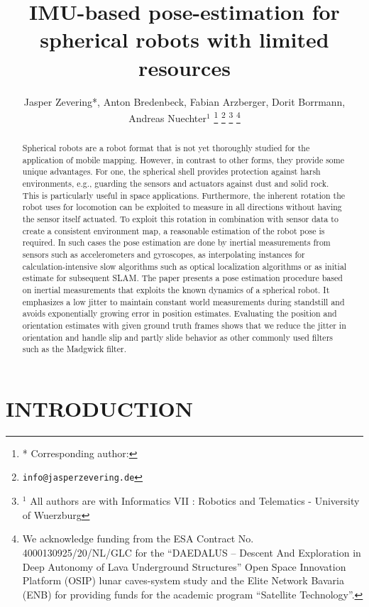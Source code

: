 \documentclass[letterpaper, 10 pt, conference]{ieeeconf}  %
\title{\LARGE \bf
IMU-based pose-estimation for spherical robots with limited resources
}
\author{Jasper Zevering*, Anton Bredenbeck, Fabian Arzberger, Dorit Borrmann, Andreas Nuechter$^{1}$%
\thanks{*
        Corresponding author: }%
        \thanks{ \quad  \tt\small info@jasperzevering.de}%
\thanks{$^{1}$ All authors are with Informatics VII : Robotics and Telematics - University of Wuerzburg}%
\thanks{We acknowledge funding from the ESA Contract No. 4000130925/20/NL/GLC for the ``DAEDALUS -- Descent And Exploration in Deep Autonomy of Lava Underground Structures” Open Space Innovation Platform (OSIP) lunar caves-system study and the Elite Network Bavaria (ENB) for providing funds for the academic program “Satellite Technology''.}
}
\begin{document}
\maketitle
\thispagestyle{empty}
\pagestyle{empty}


\begin{abstract}

Spherical robots are a robot format that is not yet thoroughly studied for the application of mobile mapping.
However, in contrast to other forms, they provide some unique advantages.
For one, the spherical shell provides protection against harsh environments, e.g., guarding the sensors and actuators against dust and solid rock.
This is particularly useful in space applications. 
Furthermore, the inherent rotation the robot uses for locomotion can be exploited to measure in all directions without having the sensor itself actuated.
To exploit this rotation in combination with sensor data to create a consistent environment map, a reasonable estimation of the robot pose is required. 
In such cases the pose estimation are done by inertial measurements from sensors such as accelerometers and gyroscopes, as interpolating instances for calculation-intensive slow algorithms such as optical localization algorithms or as initial estimate for subsequent SLAM.
The paper presents a pose estimation procedure based on inertial measurements that exploits the known dynamics of a spherical robot. 
It emphasizes a low jitter to maintain constant world measurements during standstill and avoids exponentially growing error in position estimates. 
Evaluating the position and orientation estimates with given ground truth frames shows that we reduce the jitter in orientation and handle slip and partly slide behavior as other commonly used filters such as the Madgwick filter.

\end{abstract}


\section{INTRODUCTION}
\end{document}

